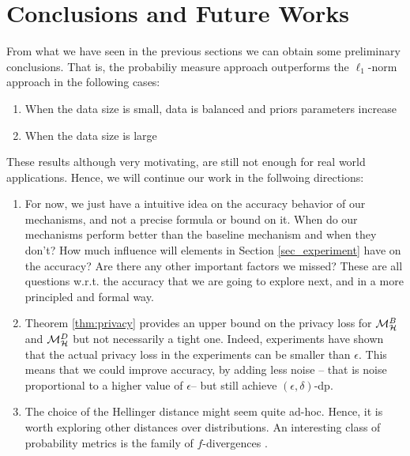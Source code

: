 \documentclass[sigconf]{acmart}
\begin{document}
\section{Conclusions and Future Works}
From what we have seen in the previous sections we can obtain some preliminary conclusions. That is, the probabiliy measure approach outperforms the $\ell_1$-norm approach in the following cases: 
\begin{enumerate}
  \item When the data size is small, data is balanced and priors parameters increase
  \item When the data size is large
\end{enumerate}

These results although very motivating, are still not enough for real world applications. Hence, we will continue our work in the follwoing directions:
\begin{enumerate}
  \item  For now, we just have a intuitive idea on the accuracy
behavior of our mechanisms, and not a precise formula or bound on
it. When do our mechanisms perform better than the baseline mechanism
and when they don't? How much influence will elements in Section
\ref{sec_experiment} have on the accuracy? Are there any other
important factors we missed? These are all questions w.r.t. the
accuracy that we are going to explore next, and in a more principled
and formal way.
\item  Theorem \ref{thm:privacy} provides an upper bound on the
privacy loss for $\mathcal{M}^{B}_{\mathcal{H}}$ and $\mathcal{M}^{D}_{\mathcal{H}}$ but not necessarily a
tight one. Indeed, experiments have shown that the actual privacy loss
in the experiments can be smaller than $\epsilon$. This means that we
could improve accuracy, by adding less noise -- that is noise
proportional to a higher value of $\epsilon$-- but still achieve
$(\epsilon, \delta)$-dp.
\item The choice of the Hellinger distance might seem quite
ad-hoc. Hence, it is worth exploring other distances over
distributions. An interesting class of probability metrics is the
family of $f$-divergences \cite{CIT-004}.
\end{enumerate}





\end{document}
